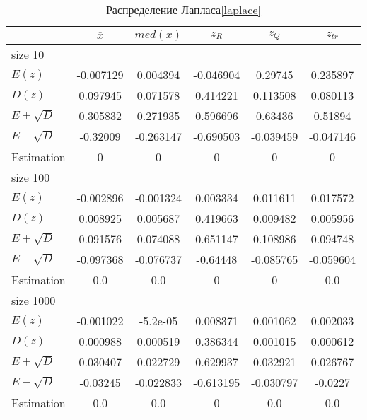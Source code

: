 \documentclass[12pt,a4paper]{article}
\begin{document}
\begin{table}[H]
    \centering
    \begin{tabular}{|l||c|c|c|c|c|}
        \hline
        & $\overline{x}$ & $med(x)$ & $z_R$ & $z_Q$ & $z_{tr}$\\\hline\hline
        size 10 & & & & &\\\hline
        $E(z)$ & -0.007129 & 0.004394 & -0.046904 & 0.29745 & 0.235897 \\\hline
        $D(z)$ & 0.097945 & 0.071578 & 0.414221 & 0.113508 & 0.080113 \\\hline
        $E + \sqrt D$ & 0.305832 & 0.271935 & 0.596696 & 0.63436 & 0.51894 \\\hline
        $E - \sqrt D$ & -0.32009 & -0.263147 & -0.690503 & -0.039459 & -0.047146 \\\hline
        Estimation & 0 & 0 & 0 & 0 & 0 \\\hline
        size 100 & & & & &\\\hline
        $E(z)$ & -0.002896 & -0.001324 & 0.003334 & 0.011611 & 0.017572 \\\hline
        $D(z)$ & 0.008925 & 0.005687 & 0.419663 & 0.009482 & 0.005956 \\\hline
        $E + \sqrt D$ & 0.091576 & 0.074088 & 0.651147 & 0.108986 & 0.094748 \\\hline
        $E - \sqrt D$ & -0.097368 & -0.076737 & -0.64448 & -0.085765 & -0.059604 \\\hline
        Estimation & 0.0 & 0.0 & 0 & 0 & 0.0 \\\hline
        size 1000 & & & & &\\\hline
        $E(z)$ & -0.001022 & -5.2e-05 & 0.008371 & 0.001062 & 0.002033 \\\hline
        $D(z)$ & 0.000988 & 0.000519 & 0.386344 & 0.001015 & 0.000612 \\\hline
        $E + \sqrt D$ & 0.030407 & 0.022729 & 0.629937 & 0.032921 & 0.026767 \\\hline
        $E - \sqrt D$ & -0.03245 & -0.022833 & -0.613195 & -0.030797 & -0.0227 \\\hline
        Estimation & 0.0 & 0.0 & 0 & 0.0 & 0.0 \\\hline
    \end{tabular}
    \caption{Распределение Лапласа\eqref{laplace}}
    \label{tab:laplace}
\end{table}
\end{document}

